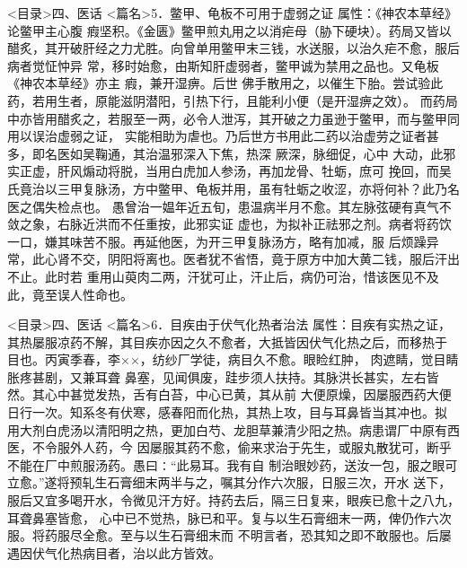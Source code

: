 \documentclass[a4paper,12pt,UTF8,twoside]{ctexbook}
\begin{document}
<目录>四、医话
<篇名>5．鳖甲、龟板不可用于虚弱之证
属性：《神农本草经》论鳖甲主心腹 瘕坚积。《金匮》鳖甲煎丸用之以消疟母（胁下硬块）。药局又皆以 
醋炙，其开破肝经之力尤胜。向曾单用鳖甲末三钱，水送服，以治久疟不愈，服后病者觉怔忡异 
常，移时始愈，由斯知肝虚弱者，鳖甲诚为禁用之品也。又龟板《神农本草经》亦主 瘕，兼开湿痹。后世 
佛手散用之，以催生下胎。尝试验此药，若用生者，原能滋阴潜阳，引热下行，且能利小便（是开湿痹之效）。 
而药局中亦皆用醋炙之，若服至一两，必令人泄泻，其开破之力虽逊于鳖甲，而与鳖甲同用以误治虚弱之证， 
实能相助为虐也。乃后世方书用此二药以治虚劳之证者甚多，即名医如吴鞠通，其治温邪深入下焦，热深 
厥深，脉细促，心中 大动，此邪实正虚，肝风煽动将脱，当用白虎加人参汤，再加龙骨、牡蛎，庶可 
挽回，而吴氏竟治以三甲复脉汤，方中鳖甲、龟板并用，虽有牡蛎之收涩，亦将何补？此乃名医之偶失检点也。 
愚曾治一媪年近五旬，患温病半月不愈。其左脉弦硬有真气不敛之象，右脉近洪而不任重按，此邪实证 
虚也，为拟补正祛邪之剂。病者将药饮一口，嫌其味苦不服。再延他医，为开三甲复脉汤方，略有加减，服 
后烦躁异常，此心肾不交，阴阳将离也。医者犹不省悟，竟于原方中加大黄二钱，服后汗出不止。此时若 
重用山萸肉二两，汗犹可止，汗止后，病仍可治，惜该医见不及此，竟至误人性命也。 

<目录>四、医话
<篇名>6．目疾由于伏气化热者治法
属性：目疾有实热之证，其热屡服凉药不解，其目疾亦因之久不愈者，大抵皆因伏气化热之后，而移热于 
目也。丙寅季春，李××，纺纱厂学徒，病目久不愈。眼睑红肿， 肉遮睛，觉目睛胀疼甚剧，又兼耳聋 
鼻塞，见闻俱废，跬步须人扶持。其脉洪长甚实，左右皆然。其心中甚觉发热，舌有白苔，中心已黄，其从前 
大便原燥，因屡服西药大便日行一次。知系冬有伏寒，感春阳而化热，其热上攻，目与耳鼻皆当其冲也。拟 
用大剂白虎汤以清阳明之热，更加白芍、龙胆草兼清少阳之热。病患谓厂中原有西医，不令服外人药，今 
因屡服其药不愈，偷来求治于先生，或服丸散犹可，断乎不能在厂中煎服汤药。愚曰∶“此易耳。我有自 
制治眼妙药，送汝一包，服之眼可立愈。”遂将预轧生石膏细末两半与之，嘱其分作六次服，日服三次，开水 
送下，服后又宜多喝开水，令微见汗方好。持药去后，隔三日复来，眼疾已愈十之八九，耳聋鼻塞皆愈， 
心中已不觉热，脉已和平。复与以生石膏细末一两，俾仍作六次服。将药服尽全愈。至与以生石膏细末而 
不明言者，恐其知之即不敢服也。后屡遇因伏气化热病目者，治以此方皆效。 
\end{document}
